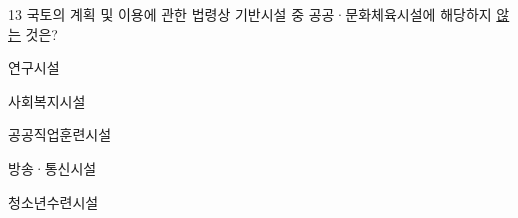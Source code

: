 \begin{question}{13}
국토의 계획 및 이용에 관한 법령상 기반시설 중 공공·문화체육시설에 해당하지 \uline{않는} 것은?
\begin{choices}
  \item 연구시설
  \item 사회복지시설
  \item 공공직업훈련시설
  \item 방송·통신시설
  \item 청소년수련시설
\end{choices}
\end{question}
